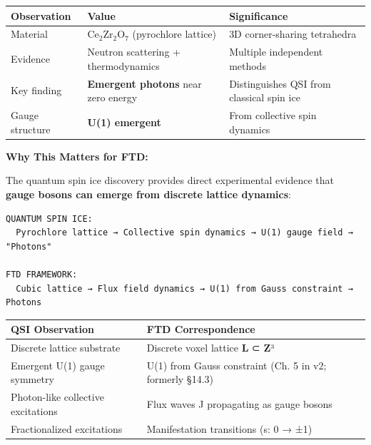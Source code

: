 \documentclass[
  11pt,
  letterpaper,
  twoside,
  openany]{book}
\begin{document}
\begin{longtable}[]{@{}
  >{\raggedright\arraybackslash}p{}
  >{\raggedright\arraybackslash}p{}
  >{\raggedright\arraybackslash}p{}@{}}
\toprule\noalign{}
\begin{minipage}[b]{\linewidth}\raggedright
Observation
\end{minipage} & \begin{minipage}[b]{\linewidth}\raggedright
Value
\end{minipage} & \begin{minipage}[b]{\linewidth}\raggedright
Significance
\end{minipage} \\
\midrule\noalign{}
\endhead
\bottomrule\noalign{}
\endlastfoot
Material & \(\text{Ce}_2\text{Zr}_2\text{O}_7\) (pyrochlore lattice) &
3D corner-sharing tetrahedra \\
Evidence & Neutron scattering + thermodynamics & Multiple independent
methods \\
Key finding & \textbf{Emergent photons} near zero energy & Distinguishes
QSI from classical spin ice \\
Gauge structure & \textbf{U(1) emergent} & From collective spin
dynamics \\
\end{longtable}

\textbf{Why This Matters for FTD:}

The quantum spin ice discovery provides direct experimental evidence
that \textbf{gauge bosons can emerge from discrete lattice dynamics}:

\begin{verbatim}
QUANTUM SPIN ICE:
  Pyrochlore lattice → Collective spin dynamics → U(1) gauge field → "Photons"

FTD FRAMEWORK:
  Cubic lattice → Flux field dynamics → U(1) from Gauss constraint → Photons
\end{verbatim}

\begin{longtable}[]{@{}
  >{\raggedright\arraybackslash}p{}
  >{\raggedright\arraybackslash}p{}@{}}
\toprule\noalign{}
\begin{minipage}[b]{\linewidth}\raggedright
QSI Observation
\end{minipage} & \begin{minipage}[b]{\linewidth}\raggedright
FTD Correspondence
\end{minipage} \\
\midrule\noalign{}
\endhead
\bottomrule\noalign{}
\endlastfoot
Discrete lattice substrate & Discrete voxel lattice \textbf{L} ⊂
\textbf{Z}³ \\
Emergent U(1) gauge symmetry & U(1) from Gauss constraint (Ch. 5 in v2;
formerly §14.3) \\
Photon-like collective excitations & Flux waves J propagating as gauge
bosons \\
Fractionalized excitations & Manifestation transitions (s: 0 → ±1) \\
\end{longtable}
\end{document}
